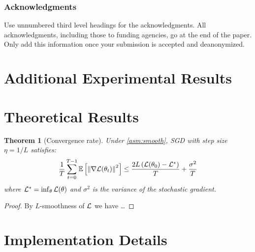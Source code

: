 \documentclass[10pt]{article} %
\newtheorem{theorem}{Theorem}[section]
\theoremstyle{definition}
\theoremstyle{remark}
\begin{document}
\subsubsection*{Acknowledgments}
Use unnumbered third level headings for the acknowledgments. All
acknowledgments, including those to funding agencies, go at the end of the paper.
Only add this information once your submission is accepted and deanonymized.




\appendix

\section{Additional Experimental Results}
\label{app:results}

\section{Theoretical Results}
\label{app:proofs}

\begin{theorem}[Convergence rate]
    \label{thm:convergence}
    Under \cref{asm:smooth}, SGD with step size $\eta = 1/L$ satisfies:
    \begin{equation}
        \frac{1}{T} \sum_{t=0}^{T-1} \mathbb{E}\left[ \left\lVert \nabla \mathcal{L}(\theta_t) \right\rVert^2 \right]
        \leq \frac{2L \left( \mathcal{L}(\theta_0) - \mathcal{L}^* \right)}{T} + \frac{\sigma^2}{T}
    \end{equation}
    where $\mathcal{L}^* = \inf_\theta \mathcal{L}(\theta)$ and $\sigma^2$ is the variance of the stochastic gradient.
\end{theorem}

\begin{proof}
    By $L$-smoothness of $\mathcal{L}$ we have \ldots
\end{proof}

\section{Implementation Details}
\label{app:implementation}
\end{document}
